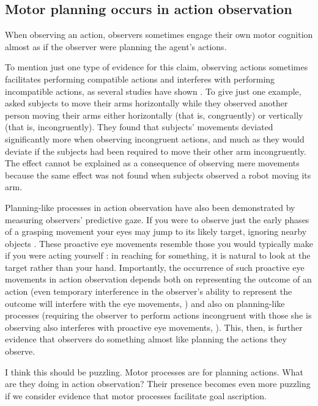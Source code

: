 \documentclass[12pt,\papersize]{extarticle}
\begin{document}
\subsection{Motor planning occurs in action observation}
When observing an action,
	observers sometimes engage their own motor cognition 
	almost as if the observer were planning the agent's actions. 

To mention just one type of evidence for this claim,
observing actions sometimes facilitates performing compatible actions and interferes with performing incompatible actions, as several studies have shown \citep{brass:2000_compatibility, craighero:2002_hand, kilner:2003_interference, costantini:2012_does}. 
To give just one example, \citet{kilner:2003_interference} asked subjects to move their arms horizontally while they observed another person moving their arms either horizontally (that is, congruently) or vertically (that is, incongruently). 
They found that subjects' movements deviated significantly more when observing incongruent actions, and much as they would deviate if the subjects had been required to move their other arm incongruently. 
The effect cannot be explained as a consequence of observing mere movements because the same effect was not found when subjects observed a robot moving its arm.

Planning-like processes in action observation have also been demonstrated by measuring observers’ predictive gaze.  If you were to observe just the early phases of a grasping movement your eyes may jump to its likely target, ignoring nearby objects \citep{ambrosini:2011_grasping}. These proactive eye movements resemble those you would typically make if you were acting yourself \citep{Flanagan:2003lm}: in reaching for something, it is natural to look at the target rather than your hand.  Importantly, the occurrence of such proactive eye movements in action observation depends both on representing the outcome of an action (even temporary interference in the observer's ability to represent the outcome will interfere with the eye movements, \citealp{Costantini:2012fk}) and also on planning-like processes (requiring the observer to perform actions incongruent with those she is observing also interferes with proactive eye movements, \citealp{Costantini:2012uq}).  This, then, is further evidence that observers do something almost like planning the actions they observe.  

I think this should be puzzling.
Motor processes are for planning actions.
What are they doing in action observation?
Their presence becomes even more puzzling if we consider evidence that motor processes facilitate goal ascription.
\end{document}
